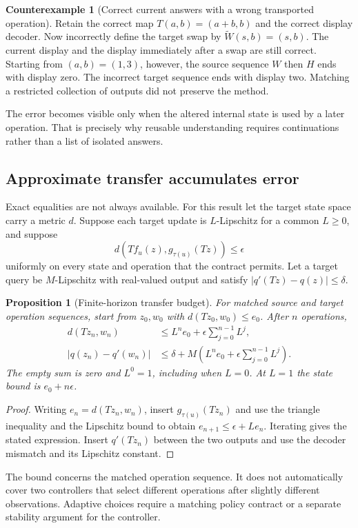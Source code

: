 \documentclass[11pt,letterpaper]{article}
\theoremstyle{plain}
\newtheorem{proposition}[theorem]{Proposition}
\theoremstyle{definition}
\newtheorem{counterexample}[theorem]{Counterexample}
\begin{document}
\begin{counterexample}[Correct current answers with a wrong transported operation]\label{ex:badtransport}
Retain the correct map $T(a,b)=(a+b,b)$ and the correct display decoder. Now incorrectly define the target swap by $\widetilde W(s,b)=(s,b)$. The current display and the display immediately after a swap are still correct. Starting from $(a,b)=(1,3)$, however, the source sequence $W$ then $H$ ends with display zero. The incorrect target sequence ends with display two. Matching a restricted collection of outputs did not preserve the method.
\end{counterexample}
The error becomes visible only when the altered internal state is used by a later operation. That is precisely why reusable understanding requires continuations rather than a list of isolated answers.

\subsection{Approximate transfer accumulates error}
Exact equalities are not always available. For this result let the target state space carry a metric $d$. Suppose each target update is $L$-Lipschitz for a common $L\geq0$, and suppose
\[
d(Tf_u(z),g_{\tau(u)}(Tz))\leq\epsilon
\]
uniformly on every state and operation that the contract permits. Let a target query be $M$-Lipschitz with real-valued output and satisfy $|q'(Tz)-q(z)|\leq\delta$.

\begin{proposition}[Finite-horizon transfer budget]\label{prop:error}
For matched source and target operation sequences, start from $z_0,w_0$ with $d(Tz_0,w_0)\leq e_0$. After $n$ operations,
\begin{align*}
d(Tz_n,w_n)&\leq L^n e_0+\epsilon\sum_{j=0}^{n-1}L^j,\\
|q(z_n)-q'(w_n)|&\leq\delta+M\left(L^n e_0+\epsilon\sum_{j=0}^{n-1}L^j\right).
\end{align*}
The empty sum is zero and $L^0=1$, including when $L=0$. At $L=1$ the state bound is $e_0+n\epsilon$.
\end{proposition}
\begin{proof}
Writing $e_n=d(Tz_n,w_n)$, insert $g_{\tau(u)}(Tz_n)$ and use the triangle inequality and the Lipschitz bound to obtain $e_{n+1}\leq\epsilon+Le_n$. Iterating gives the stated expression. Insert $q'(Tz_n)$ between the two outputs and use the decoder mismatch and its Lipschitz constant.
\end{proof}
The bound concerns the matched operation sequence. It does not automatically cover two controllers that select different operations after slightly different observations. Adaptive choices require a matching policy contract or a separate stability argument for the controller.
\end{document}
